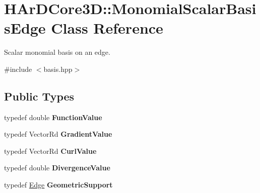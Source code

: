 \hypertarget{classHArDCore3D_1_1MonomialScalarBasisEdge}{}\section{H\+Ar\+D\+Core3D\+:\+:Monomial\+Scalar\+Basis\+Edge Class Reference}
\label{classHArDCore3D_1_1MonomialScalarBasisEdge}


Scalar monomial basis on an edge.  




{\ttfamily \#include $<$basis.\+hpp$>$}

\subsection*{Public Types}
\begin{DoxyCompactItemize}
\item 
\mbox{\label{classHArDCore3D_1_1MonomialScalarBasisEdge_a9f25382e95345bc802c4f1db2376a71f}} 
typedef double {\bfseries Function\+Value}
\item 
\mbox{\label{classHArDCore3D_1_1MonomialScalarBasisEdge_a7096d13d26f02b87debd29139b2bf18c}} 
typedef Vector\+Rd {\bfseries Gradient\+Value}
\item 
\mbox{\label{classHArDCore3D_1_1MonomialScalarBasisEdge_a57374e5bd04db14ec62c734d8860448a}} 
typedef Vector\+Rd {\bfseries Curl\+Value}
\item 
\mbox{\label{classHArDCore3D_1_1MonomialScalarBasisEdge_a8c7e18d183a1db9d029e4c6b55a8b511}} 
typedef double {\bfseries Divergence\+Value}
\item 
\mbox{\label{classHArDCore3D_1_1MonomialScalarBasisEdge_ac53bd9843072d6d731dafc58c68b789e}} 
typedef \hyperlink{classHArDCore3D_1_1Edge}{Edge} {\bfseries Geometric\+Support}
\end{DoxyCompactItemize}
